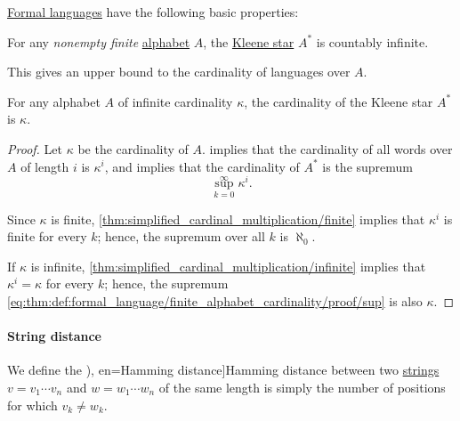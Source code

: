 \begin{proposition}\label{thm:def:formal_language}
  \hyperref[def:formal_language]{Formal languages} have the following basic properties:
  \begin{thmenum}
     For any \emph{nonempty finite} \hyperref[def:formal_language/alphabet]{alphabet} \( A \), the \hyperref[def:formal_language/kleene_star]{Kleene star} \( A^* \) is countably infinite.

    This gives an upper bound to the cardinality of languages over \( A \).

     For any alphabet \( A \) of infinite cardinality \( \kappa \), the cardinality of the Kleene star \( A^* \) is \( \kappa \).
  \end{thmenum}
\end{proposition}
\begin{proof}
   Let \( \kappa \) be the cardinality of \( A \).  implies that the cardinality of all words over \( A \) of length \( i \) is \( \kappa^i \), and  implies that the cardinality of \( A^* \) is the supremum
  \begin{equation}\label{eq:thm:def:formal_language/finite_alphabet_cardinality/proof/sup}
    \sup_{k=0}^\infty \kappa^i.
  \end{equation}

  Since \( \kappa \) is finite, \cref{thm:simplified_cardinal_multiplication/finite} implies that \( \kappa^i \) is finite for every \( k \); hence, the supremum over all \( k \) is \( \aleph_0 \).

   If \( \kappa \) is infinite, \cref{thm:simplified_cardinal_multiplication/infinite} implies that \( \kappa^i = \kappa \) for every \( k \); hence, the supremum \eqref{eq:thm:def:formal_language/finite_alphabet_cardinality/proof/sup} is also \( \kappa \).
\end{proof}

\paragraph{String distance}

\begin{definition}\label{def:hamming_distance}
  We define the \term[ru=расстояние Хэмминга (\cite[\S 6.3.3]{Новиков2013ДискретнаяМатематика}), en=Hamming distance]{Hamming distance} between two \hyperref[def:formal_language/string]{strings} \( v = v_1 \cdots v_n \) and  \( w = w_1 \cdots w_n \) of the same length is simply the number of positions for which \( v_k \neq w_k \).
\end{definition}

